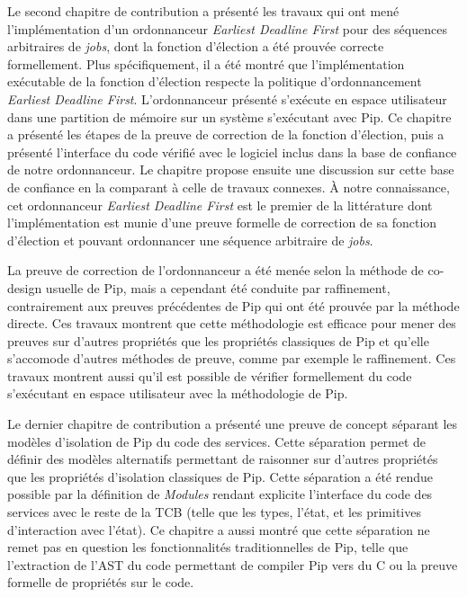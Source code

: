 		Le second chapitre de contribution a présenté les travaux qui ont mené l'implémentation d'un ordonnanceur \emph{Earliest Deadline First} pour des séquences arbitraires de \emph{jobs}, dont la fonction d'élection a été prouvée correcte formellement. Plus spécifiquement, il a été montré que l'implémentation exécutable de la fonction d'élection respecte la politique d'ordonnancement \emph{Earliest Deadline First}. L'ordonnanceur présenté s'exécute en espace utilisateur dans une partition de mémoire sur un système s'exécutant avec Pip. Ce chapitre a présenté les étapes de la preuve de correction de la fonction d'élection, puis a présenté l'interface du code vérifié avec le logiciel inclus dans la base de confiance de notre ordonnanceur. Le chapitre propose ensuite une discussion sur cette base de confiance en la comparant à celle de travaux connexes. À notre connaissance, cet ordonnanceur \emph{Earliest Deadline First} est le premier de la littérature dont l'implémentation est munie d'une preuve formelle de correction de sa fonction d'élection et pouvant ordonnancer une séquence arbitraire de \emph{jobs}.

		La preuve de correction de l'ordonnanceur a été menée selon la méthode de co-design usuelle de Pip, mais a cependant été conduite par raffinement, contrairement aux preuves précédentes de Pip qui ont été prouvée par la méthode directe. Ces travaux montrent que cette méthodologie est efficace pour mener des preuves sur d'autres propriétés que les propriétés classiques de Pip et qu'elle s'accomode d'autres méthodes de preuve, comme par exemple le raffinement. Ces travaux montrent aussi qu'il est possible de vérifier formellement du code s'exécutant en espace utilisateur avec la méthodologie de Pip.

		Le dernier chapitre de contribution a présenté une preuve de concept séparant les modèles d'isolation de Pip du code des services. Cette séparation permet de définir des modèles alternatifs permettant de raisonner sur d'autres propriétés que les propriétés d'isolation classiques de Pip. Cette séparation a été rendue possible par la définition de \emph{Modules} rendant explicite l'interface du code des services avec le reste de la TCB (telle que les types, l'état, et les primitives d'interaction avec l'état). Ce chapitre a aussi montré que cette séparation ne remet pas en question les fonctionnalités traditionnelles de Pip, telle que l'extraction de l'AST du code permettant de compiler Pip vers du C ou la preuve formelle de propriétés sur le code.

